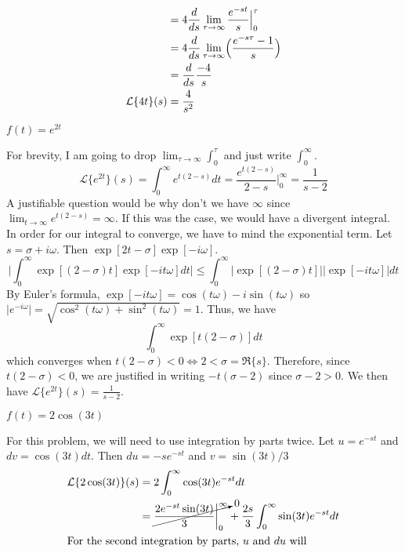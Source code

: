 \begin{exercise}
\begin{exercise}[label = (\alph*), ref = \arabic{exercisei} (\alph*)]
\begin{align*}
      & = 4\frac{d}{ds}\lim_{\tau\to\infty}\frac{e^{-st}}{s}\Bigr|_0^{\tau}\\
      & = 4\frac{d}{ds}\lim_{\tau\to\infty}
        \Bigl(\frac{e^{-s\tau} - 1}{s}\Bigr)\\
      & = \frac{d}{ds}\frac{-4}{s}\\
      \mathcal{L}\{4t\}(s) & = \frac{4}{s^2}
    \end{align*}
  \item
    \(f(t) = e^{2t}\)
    \par\smallskip
    For brevity, I am going to drop \(\lim_{\tau\to\infty}\int_0^{\tau}\) and
    just write \(\int_0^{\infty}\).
    \[
    \mathcal{L}\{e^{2t}\}(s) = \int_0^{\infty}e^{t(2 - s)}dt =
    \frac{e^{t(2 - s)}}{2 - s}\biggr|_0^{\infty} = \frac{1}{s - 2}
    \]
    A justifiable question would be why don't we have \(\infty\) since
    \(\lim_{t\to\infty}e^{t(2 - s)} = \infty\).
    If this was the case, we would have a divergent integral.
    In order for our integral to converge, we have to mind the exponential
    term.
    Let \(s = \sigma + i\omega\).
    Then \(\exp[2t - \sigma]\exp[-i\omega]\).
    \[
    \biggl\lvert\int_0^{\infty}\exp[(2 - \sigma)t]\exp[-it\omega]dt\biggr\rvert
    \leq\int_0^{\infty}\bigl\lvert\exp[(2 - \sigma)t]\bigr\rvert
    \bigl\lvert\exp[-it\omega]\bigr\rvert dt
    \]
    By Euler's formula, \(\exp[-it\omega] = \cos(t\omega) - i\sin(t\omega)\) so
    \(\lvert e^{-i\omega}\rvert =
    \sqrt{\cos^2(t\omega) + \sin^2(t\omega)} = 1\).
    Thus, we have
    \[
    \int_0^{\infty}\exp[t(2 - \sigma)]dt
    \]
    which converges when \(t(2 - \sigma) < 0\iff 2 < \sigma = \Re\{s\}\).
    Therefore, since \(t(2 - \sigma) < 0\), we are justified in writing
    \(-t(\sigma - 2)\) since \(\sigma - 2 > 0\).
    We then have \(\mathcal{L}\{e^{2t}\}(s) = \frac{1}{s - 2}\).
  \item
    \label{1c}
    \(f(t) = 2\cos(3t)\)
    \par\smallskip
    For this problem, we will need to use integration by parts twice.
    Let \(u = e^{-st}\) and \(dv = \cos(3t)dt\).
    Then \(du = -se^{-st}\) and \(v = \sin(3t)/3\)
    \begin{align*}
      \mathcal{L}\{2\cos(3t)\}(s)
      & = 2\int_0^{\infty}\cos(3t)e^{-st}dt\\
      & = \cancelto{0}{\frac{2e^{-st}\sin(3t)}{3}\biggl|_0^{\infty}} +
        \frac{2s}{3}\int_0^{\infty}\sin(3t)e^{-st}dt\\
      \intertext{For the second integration by parts, \(u\) and \(du\) will
}
\end{align*}
\end{exercise}
\end{exercise}
